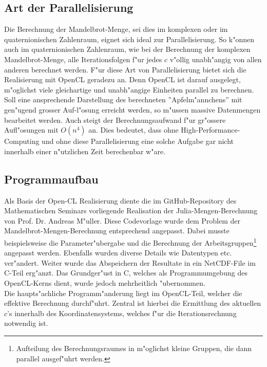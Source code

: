 \begin{refsection}
	\subsection{Art der Parallelisierung}
		Die Berechnung der Mandelbrot-Menge, sei dies im komplexen oder im quaternionischen Zahlenraum, eignet sich ideal zur Parallelisierung. So k"onnen auch im quaternionischen Zahlenraum, wie bei der Berechnung der komplexen Mandelbrot-Menge, alle Iterationsfolgen f"ur jedes $c$ v"ollig unabh"angig von allen anderen berechnet werden. F"ur diese Art von Parallelisierung bietet sich die Realisierung mit OpenCL geradezu an. Denn OpenCL ist darauf ausgelegt, m"oglichst viele gleichartige und unabh"angige Einheiten parallel zu berechnen. \\[0.3cm]
		Soll eine ansprechende Darstellung des berechneten ''Apfelm"annchens'' mit gen"ugend grosser Auf-l"osung erreicht werden, so m"ussen massive Datenmengen bearbeitet werden. Auch steigt der Berechnungsaufwand f"ur gr"ossere Aufl"osungen mit $O(n^4)$ an. Dies bedeutet, dass ohne High-Performance-Computing und ohne diese Parallelisierung eine solche Aufgabe gar nicht innerhalb einer n"utzlichen Zeit berechenbar w"are. 
		
	\subsection{Programmaufbau}
		Als Basis der Open-CL Realisierung diente die im GitHub-Repository des Mathematischen Seminars vorliegende Realisation der Julia-Mengen-Berechnung von Prof. Dr. Andreas M"uller. Diese Codevorlage wurde dem Problem der Mandelbrot-Mengen-Berechnung entsprechend angepasst. Dabei musste beispielsweise die Parameter"ubergabe und die Berechnung der Arbeitsgruppen\footnote{Aufteilung des Berechnungsraumes in m"oglichst kleine Gruppen, die dann parallel ausgef"uhrt werden.} angepasst werden. Ebenfalls wurden diverse Details wie Datentypen etc. ver"andert. Weiter wurde das Abspeichern der Resultate in ein NetCDF-File im C-Teil erg"anzt. Das Grundger"ust in C, welches als Programmumgebung des OpenCL-Kerns dient, wurde jedoch mehrheitlich "ubernommen. \\[0.3cm]		
		Die haupts"achliche Programm"anderung liegt im OpenCL-Teil, welcher die effektive Berechnung durchf"uhrt. Zentral ist hierbei die Ermittlung des aktuellen $c$'s innerhalb des Koordinatensystems, welches f"ur die Iterationsrechnung notwendig ist. 
		

\end{refsection}

